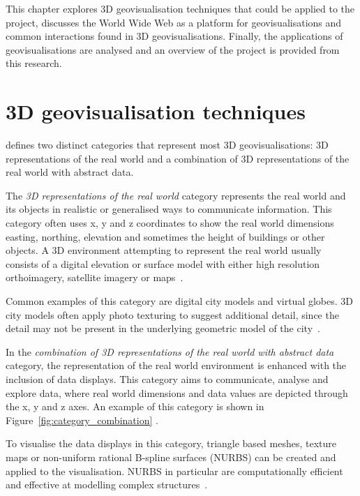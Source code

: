 This chapter explores 3D geovisualisation techniques that could be applied to the project, discusses the World Wide Web as a platform for geovisualisations and common interactions found in 3D geovisualisations. Finally, the applications of geovisualisations are analysed and an overview of the project is provided from this research.

\section{3D geovisualisation techniques} {

	\textcite{bleisch2012geovisualization} defines two distinct categories that represent most 3D geovisualisations: 3D representations of the real world and a combination of 3D representations of the real world with abstract data.

	The \emph{3D representations of the real world} category represents the real world and its objects in realistic or generalised ways to communicate information. This category often uses x, y and z coordinates to show the real world dimensions \textendash\, easting, northing, elevation and sometimes the height of buildings or other objects. A 3D environment attempting to represent the real world usually consists of a digital elevation or surface model with either high resolution orthoimagery, satellite imagery or maps~\parencite{bleisch2012geovisualization}.

	

	Common examples of this category are digital city models and virtual globes. 3D city models often apply photo texturing to suggest additional detail, since the detail may not be present in the underlying geometric model of the city~\parencite{bleisch2012geovisualization}.

	In the \emph{combination of 3D representations of the real world with abstract data} category, the representation of the real world environment is enhanced with the inclusion of data displays. This category aims to communicate, analyse and explore data, where real world dimensions and data values are depicted through the x, y and z axes. An example of this category is shown in Figure~\ref{fig:category_combination} \parencite{bleisch2012geovisualization}.

	To visualise the data displays in this category, triangle based meshes, texture maps or non-uniform rational B-spline surfaces (NURBS) can be created and applied to the visualisation. NURBS in particular are computationally efficient and effective at modelling complex structures~\parencite{hildebrandt2011image, zhong2006enhanced}.

}

